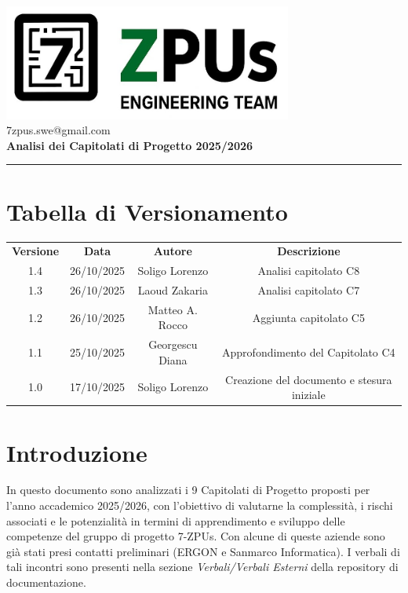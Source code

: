 \documentclass[a4paper,12pt]{article}
\begin{document}
\begin{center}
    \includegraphics[width=9.5cm]{../assets/logo7ZPUs.jpg}\\
    \small\hspace{10cm} 7zpus.swe@gmail.com\\
    \vspace{0.5cm}
    \Large \textbf{Analisi dei Capitolati di Progetto 2025/2026}\\
\end{center}

\vspace{0.3cm}
\hrule
\vspace{0.5cm}

\tableofcontents

\newpage

\section*{Tabella di Versionamento}
\begin{tabular}{|c|c|c|c|}
    \hline
    \textbf{Versione} & \textbf{Data} & \textbf{Autore} & \textbf{Descrizione}\\
    1.4               & 26/10/2025   & Soligo Lorenzo    & Analisi capitolato C8\\
    \hline
    1.3               & 26/10/2025   & Laoud Zakaria    & Analisi capitolato C7\\
    \hline
    1.2               & 26/10/2025    & Matteo A. Rocco  & Aggiunta capitolato C5 \\
    \hline
    1.1 & 25/10/2025 & Georgescu Diana & Approfondimento del Capitolato C4 \\
    \hline
    1.0               & 17/10/2025    & Soligo Lorenzo  & Creazione del documento e stesura iniziale \\
    \hline

\end{tabular}

\section{Introduzione}
In questo documento sono analizzati i 9 Capitolati di Progetto proposti per
l'anno accademico 2025/2026, con l'obiettivo di valutarne la complessità, i
rischi associati e le potenzialità in termini di apprendimento e sviluppo delle
competenze del gruppo di progetto 7-ZPUs. Con alcune di queste aziende sono già
stati presi contatti preliminari (ERGON e Sanmarco Informatica). I verbali di
tali incontri sono presenti nella sezione \textit{Verbali/Verbali Esterni}
della repository di documentazione. \vspace{0.5cm}
\end{document}

